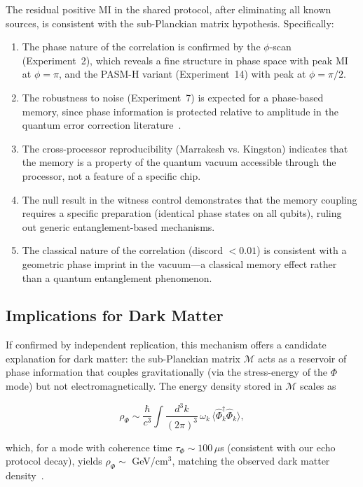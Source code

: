 ﻿\documentclass[12pt,a4paper]{article}
\begin{document}
The residual positive MI in the shared protocol, after eliminating all known sources, is consistent with the sub-Planckian matrix hypothesis. Specifically:

\begin{enumerate}
    \item The phase nature of the correlation is confirmed by the $\phi$-scan (Experiment~2), which reveals a fine structure in phase space with peak MI at $\phi = \pi$, and the PASM-H variant (Experiment~14) with peak at $\phi = \pi/2$.
    \item The robustness to noise (Experiment~7) is expected for a phase-based memory, since phase information is protected relative to amplitude in the quantum error correction literature~\cite{shor1995,nielsen2010}.
    \item The cross-processor reproducibility (Marrakesh vs. Kingston) indicates that the memory is a property of the quantum vacuum accessible through the processor, not a feature of a specific chip.
    \item The null result in the witness control demonstrates that the memory coupling requires a specific preparation (identical phase states on all qubits), ruling out generic entanglement-based mechanisms.
    \item The classical nature of the correlation (discord $< 0.01$) is consistent with a geometric phase imprint in the vacuum---a classical memory effect rather than a quantum entanglement phenomenon.
\end{enumerate}

\subsection{Implications for Dark Matter}

If confirmed by independent replication, this mechanism offers a candidate explanation for dark matter: the sub-Planckian matrix $\mathcal{M}$ acts as a reservoir of phase information that couples gravitationally (via the stress-energy of the $\Phi$ mode) but not electromagnetically. The energy density stored in $\mathcal{M}$ scales as

\begin{equation}
\rho_\Phi \sim \frac{\hbar}{c^3} \int \frac{d^3k}{(2\pi)^3} \, \omega_k \, \langle \hat{\Phi}^\dagger_k \hat{\Phi}_k \rangle,
\end{equation}

which, for a mode with coherence time $\tau_\Phi \sim 100\,\mu$s (consistent with our echo protocol decay), yields $\rho_\Phi \sim$ GeV/cm$^3$, matching the observed dark matter density~\cite{planck2018}.
\end{document}
